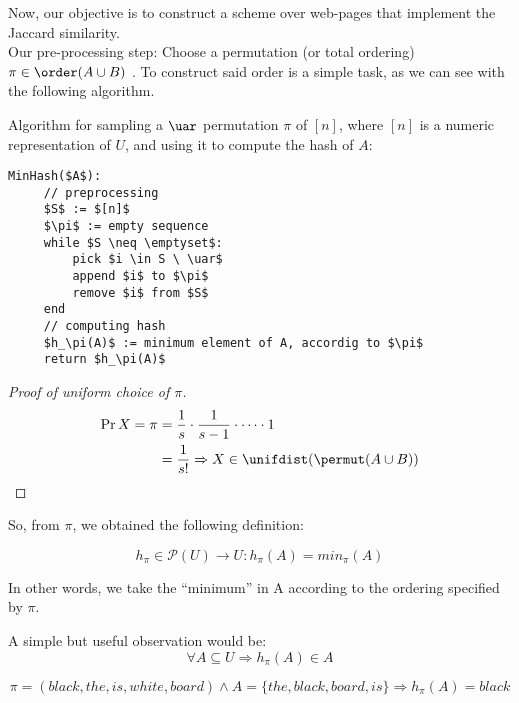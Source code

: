 	Now, our objective is to construct a scheme over web-pages that implement the Jaccard similarity.\\
	Our pre-processing step: Choose a permutation (or total ordering) $\pi \in \order(A \cup B)$ \uar. To construct said order is a simple task, as we can see with the following algorithm.
	
	Algorithm for sampling a $\uar$ permutation $\pi$ of $[n]$, where $[n]$ is a numeric representation of $U$, and using it to compute the hash of $A$:
	\begin{lstlisting}[caption={min hash or shingles algorithm},label={lst:min_hash}]
MinHash($A$):
     // preprocessing
     $S$ := $[n]$
     $\pi$ := empty sequence
     while $S \neq \emptyset$:
         pick $i \in S \ \uar$
         append $i$ to $\pi$
         remove $i$ from $S$
     end
     // computing hash
     $h_\pi(A)$ := minimum element of A, accordig to $\pi$
     return $h_\pi(A)$
	\end{lstlisting}
	
    \begin{proof}[Proof of uniform choice of $\pi$]
        \begin{align*}
        \Pr{X = \pi} &= \frac{1}{s}\cdot\frac{1}{s-1}\cdot\dots\cdot 1\\
        &= \frac{1}{s!} \Rightarrow X \in \unifdist(\permut(A \cup B))
        \end{align*}
    \end{proof}
	
	So, from $\pi$, we obtained the following definition:
    \begin{defn}
        \begin{equation}
        h_\pi \in \mathcal{P}(U) \to U : h_\pi(A) = min_\pi(A)
        \end{equation}
    \end{defn}
	
	In other words, we take the ``minimum'' in A according to the ordering specified by $\pi$.
    
    \begin{obs}
        A simple but useful observation would be:
        \begin{equation}
        \forall A \subseteq U \Rightarrow h_\pi(A) \in A
        \end{equation}
    \end{obs}
	
	\begin{ex}
       	\begin{equation*}
            \pi = (black, the, is, white, board) \wedge A = \{the, black, board, is\} \Rightarrow h_\pi(A) = black
        \end{equation*}
    \end{ex}
	

